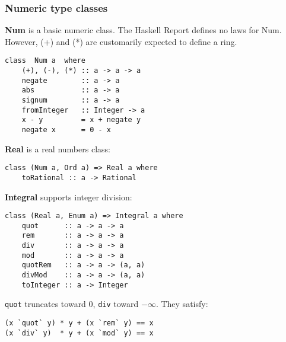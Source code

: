 %

\subsubsection{Numeric type classes}


\textbf{Num} is a basic numeric class.
The Haskell Report defines no laws for Num.
However, (+) and (*) are customarily expected to define a ring.
\begin{verbatim}
class  Num a  where
    (+), (-), (*) :: a -> a -> a
    negate        :: a -> a
    abs           :: a -> a
    signum        :: a -> a
    fromInteger   :: Integer -> a
    x - y         = x + negate y
    negate x      = 0 - x
\end{verbatim}

\textbf{Real} is a real numbers class:
\begin{verbatim}
class (Num a, Ord a) => Real a where
    toRational :: a -> Rational 
\end{verbatim}

\textbf{Integral} supports integer division:
\begin{verbatim}
class (Real a, Enum a) => Integral a where
    quot      :: a -> a -> a
    rem       :: a -> a -> a
    div       :: a -> a -> a
    mod       :: a -> a -> a
    quotRem   :: a -> a -> (a, a) 
    divMod    :: a -> a -> (a, a) 
    toInteger :: a -> Integer 
\end{verbatim}

\texttt{quot} truncates toward $0$, \texttt{div} toward $-\infty$.
They satisfy:
\begin{verbatim}
(x `quot` y) * y + (x `rem` y) == x
(x `div` y)  * y + (x `mod` y) == x
\end{verbatim}

